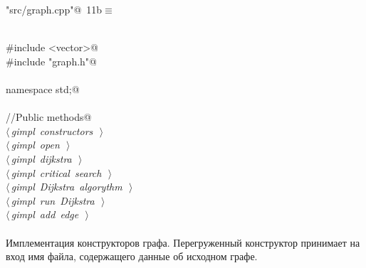 \documentclass[12pt]{article}
\begin{document}
\begin{flushleft} \small\label{scrap21}\raggedright\small
{} \verb@"src/graph.cpp"@\nobreak\ {\footnotesize {11b}}$\equiv$
\vspace{-1ex}
\begin{list}{}{} \item
\mbox{}\verb@@\\
\mbox{}\verb@#include <vector>@\\
\mbox{}\verb@#include "graph.h"@\\
\mbox{}\verb@@\\
\mbox{}\verb@using namespace std;@\\
\mbox{}\verb@@\\
\mbox{}\verb@//Public methods@\\
\mbox{}\verb@@\hbox{$\langle\,${\itshape gimpl constructors}\nobreak\ {\footnotesize {}}$\,\rangle$}\verb@@\\
\mbox{}\verb@@\hbox{$\langle\,${\itshape gimpl open}\nobreak\ {\footnotesize {}}$\,\rangle$}\verb@@\\
\mbox{}\verb@@\hbox{$\langle\,${\itshape gimpl dijkstra}\nobreak\ {\footnotesize {}}$\,\rangle$}\verb@@\\
\mbox{}\verb@@\hbox{$\langle\,${\itshape gimpl critical search}\nobreak\ {\footnotesize {}}$\,\rangle$}\verb@@\\
\mbox{}\verb@@\hbox{$\langle\,${\itshape gimpl Dijkstra algorythm}\nobreak\ {\footnotesize {}}$\,\rangle$}\verb@@\\
\mbox{}\verb@@\hbox{$\langle\,${\itshape gimpl run Dijkstra}\nobreak\ {\footnotesize {}}$\,\rangle$}\verb@@\\
\mbox{}\verb@@\hbox{$\langle\,${\itshape gimpl add edge}\nobreak\ {\footnotesize {}}$\,\rangle$}\verb@@\\
\mbox{}\verb@@{\NWsep}
\end{list}
\vspace{-1.5ex}
\footnotesize
\begin{list}{}{\setlength{\itemsep}{-\parsep}\setlength{\itemindent}{-\leftmargin}}

\item{}
\end{list}
\vspace{4ex}
\end{flushleft}
\paragraph{}
Имплементация конструкторов графа. Перегруженный конструктор принимает на вход имя файла, содержащего
данные об исходном графе.
\end{document}
